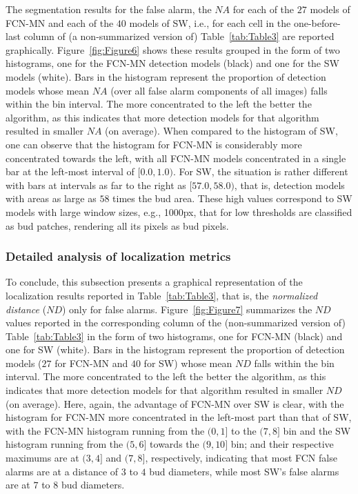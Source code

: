 \documentclass[a4paper,authoryear,review]{elsarticle}
\begin{document}
The segmentation results for the false alarm, the $NA$  for each of the $27$ models of FCN-MN and each of the $40$ models of SW, i.e., for each cell in the  one-before-last column of (a non-summarized version of) Table~\ref{tab:Table3} are reported graphically. Figure~\ref{fig:Figure6} shows these results grouped in the form of two histograms, one for the FCN-MN detection models (black) and one for the SW models  (white). Bars in the histogram represent the proportion of detection models whose mean $NA$ (over all false alarm components of all images) falls within the bin interval. The more concentrated to the left the better the algorithm, as this indicates that more detection models for that algorithm resulted in smaller $NA$ (on average). When compared to the histogram of SW, one can observe that the histogram for FCN-MN is considerably more concentrated towards the left, with all FCN-MN models concentrated in a single bar at the left-most interval of $[0.0, 1.0)$. For SW, the situation is rather different with bars at intervals as far to the right as $[57.0, 58.0)$, that is, detection models with areas as large as $58$ times the bud area. These high values correspond to SW models with large window sizes, e.g., 1000px, that for low thresholds are classified as bud patches, rendering all its pixels as bud pixels.

\subsubsection{Detailed analysis of localization metrics}

To conclude, this subsection presents a graphical representation of the localization results reported in Table~\ref{tab:Table3}, that is,  the \emph{normalized distance} ($ND$) only for false alarms. 
%
Figure~\ref{fig:Figure7} summarizes the $ND$ values reported in the corresponding column of the (non-summarized version of) Table~\ref{tab:Table3} in the form of two histograms, one for FCN-MN (black) and one for SW (white).  Bars in the histogram represent the proportion of detection models ($27$ for FCN-MN and $40$ for SW) whose mean $ND$ falls within the bin interval. The more concentrated to the left the better the algorithm, as this indicates that more detection models for that algorithm resulted in smaller $ND$ (on average).
%
Here, again, the advantage of FCN-MN over SW is clear, with the histogram for FCN-MN more concentrated in the left-most part than that of SW, with the FCN-MN histogram running from the $(0,1]$ to the $(7,8]$ bin and the SW histogram running from the $(5,6]$ towards the $(9,10]$ bin; and their respective maximums are at $(3,4]$ and $(7,8]$, respectively, indicating that most FCN false alarms are at a distance of $3$ to $4$ bud diameters, while most SW’s false alarms are at $7$ to $8$ bud diameters. 
\end{document}
